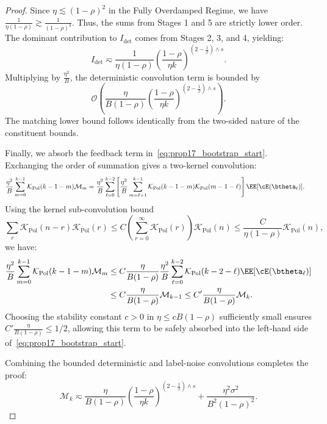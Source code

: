 \begin{proof}
Since $\eta \lesssim (1-\rho)^2$ in the Fully Overdamped Regime, we have $\frac{1}{\eta(1-\rho)} \gtrsim \frac{1}{(1-\rho)^3}$. Thus, the sums from Stages 1 and 5 are strictly lower order. The dominant contribution to $I_{\mathrm{det}}$ comes from Stages 2, 3, and 4, yielding:
\[
    I_{\mathrm{det}} \eqsim \frac{1}{\eta(1-\rho)} \left(\frac{1-\rho}{\eta k}\right)^{\left(2-\frac1\beta\right)\wedge s}.
\]
Multiplying by $\frac{\eta^2}{B}$, the deterministic convolution term is bounded by
\[
\mathcal{O}\left( \frac{\eta}{B(1-\rho)} \left(\frac{1-\rho}{\eta k}\right)^{\left(2-\frac1\beta\right)\wedge s} \right). 
\]
The matching lower bound follows identically from the two-sided nature of the constituent bounds.

Finally, we absorb the feedback term in~\eqref{eq:prop17_bootstrap_start}. Exchanging the order of summation gives a two-kernel convolution:
\begin{align*}
    \frac{\eta^2}{B}\sum_{m=0}^{k-1}\mathcal K_{\mathrm{Pol}}(k-1-m)\mathcal M_m
    &= \frac{\eta^2}{B}\sum_{\ell=0}^{k-2} \left[ \frac{\eta^2}{B}\sum_{m=\ell+1}^{k-1} \mathcal K_{\mathrm{Pol}}(k-1-m)\mathcal K_{\mathrm{Pol}}(m-1-\ell) \right] \EE[\cE(\btheta_\ell)].
\end{align*}
Using the kernel sub-convolution bound 
\[
\sum_{r} \mathcal K_{\mathrm{Pol}}(n-r)\mathcal K_{\mathrm{Pol}}(r) \le C \left(\sum_{r=0}^{\infty}\mathcal K_{\mathrm{Pol}}(r)\right) \mathcal K_{\mathrm{Pol}}(n) \le \frac{C}{\eta(1-\rho)}\mathcal K_{\mathrm{Pol}}(n),
\]
we have:
\begin{align*}
    \frac{\eta^2}{B}\sum_{m=0}^{k-1}\mathcal K_{\mathrm{Pol}}(k-1-m)\mathcal M_m
    &\le C\frac{\eta}{B(1-\rho)} \frac{\eta^2}{B}\sum_{\ell=0}^{k-2}\mathcal K_{\mathrm{Pol}}(k-2-\ell)\EE[\cE(\btheta_\ell)] \nonumber \\
    &\le C\frac{\eta}{B(1-\rho)}\mathcal M_{k-1} \le C'\frac{\eta}{B(1-\rho)}\mathcal M_k .
\end{align*}
Choosing the stability constant $c>0$ in $\eta\le cB(1-\rho)$ sufficiently small ensures $C'\frac{\eta}{B(1-\rho)} \le 1/2$, allowing this term to be safely absorbed into the left-hand side of~\eqref{eq:prop17_bootstrap_start}.

Combining the bounded deterministic and label-noise convolutions completes the proof:
\[
    \mathcal M_k \eqsim \frac{\eta}{B(1-\rho)} \left(\frac{1-\rho}{\eta k}\right)^{\left(2-\frac1\beta\right)\wedge s} + \frac{\eta^2\sigma^2}{B^2(1-\rho)^2}.
\]
\end{proof}

